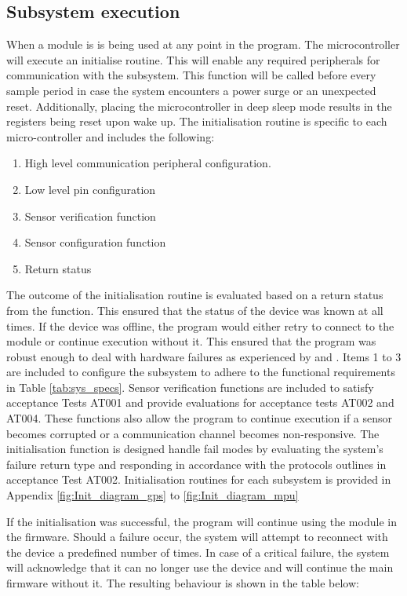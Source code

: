 \subsection{Subsystem execution}

When a module is is being used at any point in the program. The microcontroller will execute an initialise routine. This will enable any required peripherals for communication with the subsystem. This function will be called before every sample period in case the system encounters a power surge or an unexpected reset. Additionally, placing the microcontroller in deep sleep mode results in the registers being reset upon wake up. The initialisation routine is specific to each micro-controller and includes the following:

\begin{enumerate}
	\item High level communication peripheral configuration.
	\item Low level pin configuration
	\item Sensor verification function
	\item Sensor configuration function
	\item Return status
\end{enumerate}

The outcome of the initialisation routine is evaluated based on a return status from the function. This ensured that the status of the device was known at all times. If the device was offline, the program would either retry to connect to the module or continue execution without it. This ensured that the program was robust enough to deal with hardware failures as experienced by \textcite{doble2017robust} and \textcite{rabault2018investigation}. Items 1 to 3 are included to configure the subsystem to adhere to the functional requirements in Table \ref{tab:sys_specs}. Sensor verification functions are included to satisfy acceptance Tests AT001 and provide evaluations for acceptance tests AT002 and AT004. These functions also allow the program to continue execution if a sensor becomes corrupted or a communication channel becomes non-responsive. The initialisation function is designed handle fail modes by evaluating the system's failure return type and responding in accordance with the protocols outlines in acceptance Test AT002. Initialisation routines for each subsystem is provided in Appendix \ref{fig:Init_diagram_gps} to \ref{fig:Init_diagram_mpu}

If the initialisation was successful, the program will continue using the module in the firmware. Should a failure occur, the system will attempt to reconnect with the device a predefined number of times. In case of a critical failure, the system will acknowledge that it can no longer use the device and will continue the main firmware without it. The resulting behaviour is shown in the table below:

